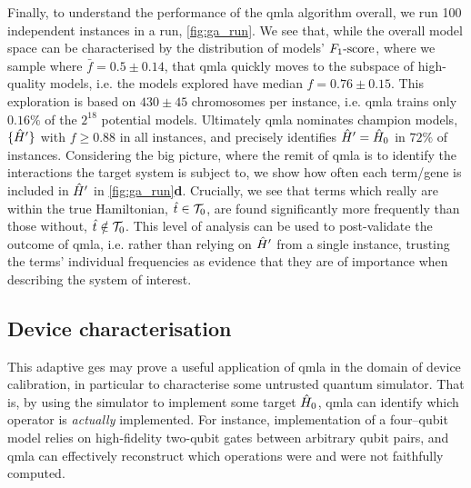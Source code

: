 Finally, to understand the performance of the \gls{qmla} algorithm overall, 
    we run 100 independent \glspl{instance} in a \gls{run}, \cref{fig:ga_run}. 
We see that, while the overall \gls{model space} can be characterised by the distribution 
    of models' $ F_{1}\text{-score} $, where we sample where $\bar{f} = 0.5 \pm 0.14$, 
    that \gls{qmla} quickly moves to the subspace of high-quality models, 
    i.e. the models explored have median $f = 0.76 \pm 0.15$.
This exploration is based on $430 \pm 45$ chromosomes per instance, 
    i.e. \gls{qmla} trains only $0.16\%$ of the $2^{18}$ potential models. 
Ultimately \gls{qmla} nominates \glspl{champion model}, $\{ \hat{H}^{\prime} \}$ with $f \geq 0.88$ in all instances, 
    and precisely identifies $\hat{H}^{\prime}=\hat{H}_0$ in $72\%$ of instances. 
Considering the big picture, where the remit of \gls{qmla} is to identify the interactions 
    the target system is subject to, we show how often each term/gene is included in $\hat{H}^{\prime}$ in 
    \cref{fig:ga_run}\textbf{d}. 
Crucially, we see that terms which really are within the true Hamiltonian, $\hat{t} \in \mathcal{T}_0$, 
    are found significantly more frequently than those without, $\hat{t} \notin \mathcal{T}_0$. 
This level of analysis can be used to post-validate the outcome of \gls{qmla}, 
    i.e. rather than relying on $\hat{H}^{\prime}$ from a single instance, 
    trusting the terms' individual frequencies as evidence that they are of importance when describing 
    the system of interest. 

\subsection{Device characterisation}
This adaptive \gls{ges} may prove a useful application of \gls{qmla} in the domain of device calibration,
    in particular to characterise some untrusted quantum simulator.
That is, by using the simulator to implement some target $\hat{H}_0$, 
    \gls{qmla} can identify which operator is \emph{actually} implemented.
For instance, implementation of a four--qubit model
    relies on high-fidelity two-qubit gates between arbitrary qubit pairs, 
    and \gls{qmla} can effectively reconstruct which operations were and were not faithfully computed.
